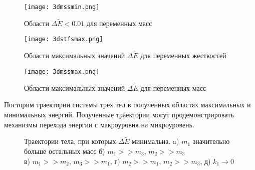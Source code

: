 \begin{figure}[b!]
    \centering
    \texttt{[image: 3dmssmin.png]}
    \caption{Области $\Delta \tilde{E} < 0.01$  для переменных масс}
    \label{minmss3d}
\end{figure}

\begin{figure}[b!]
    \centering
    \texttt{[image: 3dstfsmax.png]}
    \caption{Области максимальных значений $\Delta \tilde{E}$  для переменных жесткостей}
    \label{minmss3d}
\end{figure}

\newpage
\begin{figure}[b!]
    \centering
    \texttt{[image: 3dmssmax.png]}
    \caption{Области максимальных значений $\Delta \tilde{E}$  для переменных масс}
    \label{minmss3d}
\end{figure}

Посторим траектории системы трех тел в полученных областях максимальных и минимальных энергий. Полученные траектории могут продемонстрировать механизмы перехода
энергии с макроуровня на микроуровень.

\begin{figure}[t!]
    \centering
    \centering
    \begin{minipage}[h]{0.49\linewidth}
    \end{minipage}
    \hfill
    \begin{minipage}[h]{0.49\linewidth}
    \end{minipage}
    \begin{minipage}[h]{0.49\linewidth}
    \end{minipage}
    \begin{minipage}[h]{0.49\linewidth}
    \end{minipage}
    \begin{minipage}[h]{0.49\linewidth}
    \end{minipage}
    \caption{Траектории тела, при которых  $\Delta \tilde{E}$ минимальна. a) $m_1$ значительно больше остальных масс б) $m_1>>m_3$, $m_2>>m_3$\\
    в) $m_1>>m_2$, $m_3>>m_1$, г) $m_2>>m_1$, $m_2>>m_3$, д) $k_1 \rightarrow 0$ }
    \label{fig:mintr}
\end{figure}


